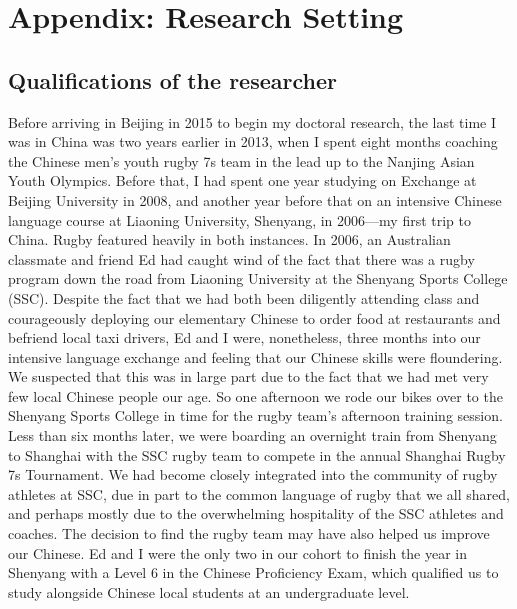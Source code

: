 \chapter{\label{app3:researchSetting}Appendix: Research Setting}

\begin{CJK}{UTF8}{gbsn}







  \section{Qualifications of the researcher\label{app3:qualPositionResearch}}

  Before arriving in Beijing in 2015 to begin my doctoral research, the last time I was in China was two years earlier in 2013, when I spent eight months coaching the Chinese men's youth rugby 7s team in the lead up to the Nanjing Asian Youth Olympics.  Before that, I had spent one year studying on Exchange at Beijing University in 2008, and another year before that on an intensive Chinese language course at Liaoning University, Shenyang, in 2006---my first trip to China.  Rugby featured heavily in both instances.  In 2006, an Australian classmate and friend Ed had caught wind of the fact that there was a rugby program down the road from Liaoning University at the Shenyang Sports College (SSC).  Despite the fact that we had both been diligently attending class and courageously deploying our elementary Chinese to order food at restaurants and befriend local taxi drivers, Ed and I were, nonetheless, three months into our intensive language exchange and feeling that our Chinese skills were floundering.  We suspected that this was in large part due to the fact that we had met very few local Chinese people our age.  So one afternoon we rode our bikes over to the Shenyang Sports College in time for the rugby team's afternoon training session.  Less than six months later, we were boarding an overnight train from Shenyang to Shanghai with the SSC rugby team to compete in the annual Shanghai Rugby 7s Tournament.  We had become closely integrated into the community of rugby athletes at SSC, due in part to the common language of rugby that we all shared, and perhaps mostly due to the overwhelming hospitality of the SSC athletes and coaches.  The decision to find the rugby team may have also helped us improve our Chinese. Ed and I were the only two in our cohort to finish the year in Shenyang with a Level 6 in the Chinese Proficiency Exam, which qualified us to study alongside Chinese local students at an undergraduate level.


\end{CJK}
